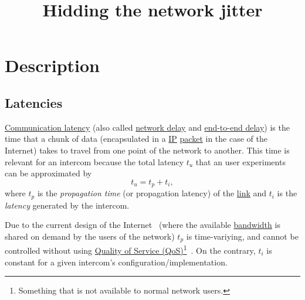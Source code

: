 
\title{Hidding the network jitter}

\maketitle

\section{Description}

\subsection{Latencies}
\href{https://en.wikipedia.org/wiki/Latency_(engineering)#Communication_latency}{Communication
  latency} (also called
\href{https://en.wikipedia.org/wiki/Network_delay}{network delay} and
\href{https://en.wikipedia.org/wiki/End-to-end_delay}{end-to-end
  delay}) is the time that a chunk of data (encapsulated
in a \href{https://en.wikipedia.org/wiki/Internet_Protocol}{IP}
\href{https://en.wikipedia.org/wiki/Network_packet}{packet} in the
case of the Internet) takes to travel from one point of the network to
another. This time is relevant for an intercom because the total
latency $t_u$ that an user experiments can be approximated by
\begin{equation}
  t_u = t_p + t_i,
  \label{eq:user_latency}
\end{equation}
where $t_p$ is the \emph{propagation time} (or propagation latency) of
the \href{https://en.wikipedia.org/wiki/Telecommunications_link}{link}
and $t_i$ is the \emph{latency} generated by the intercom.

Due to the current design of the Internet~\cite{Tanenbaum,Stallings}
(where the available
\href{https://en.wikipedia.org/wiki/Bandwidth_(computing)}{bandwidth}
is shared on demand by the users of the network) $t_p$ is
time-variying, and cannot be controlled without using
\href{https://en.wikipedia.org/wiki/Quality_of_service}{Quality of
  Service (QoS)}\footnote{Something that is not available to normal
  network users.}~\cite{dordal2020intro}. On the contrary, $t_i$ is
constant for a given intercom's configuration/implementation.

